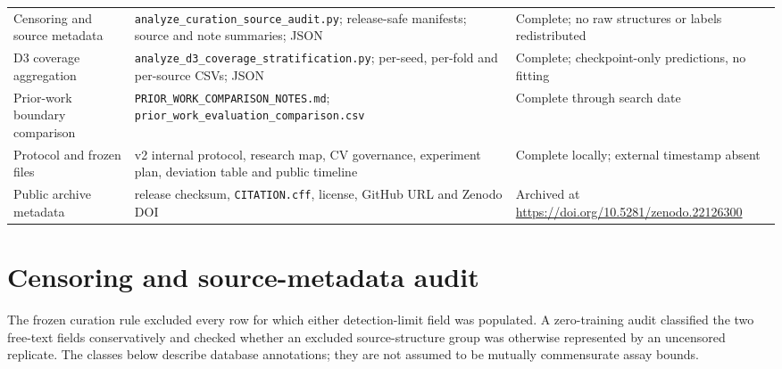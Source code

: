 \documentclass[10pt]{article}
\begin{document}
\begin{table}[htbp]
\begin{tabularx}{\textwidth}{>{\raggedright\arraybackslash}p{}>{\raggedright\arraybackslash}X>{\raggedright\arraybackslash}p{}}
Censoring and source metadata & \texttt{analyze\_\allowbreak{}curation\_\allowbreak{}source\_\allowbreak{}audit.py}; release-safe manifests; source and note summaries; JSON & Complete; no raw structures or labels redistributed \\
D3 coverage aggregation & \texttt{analyze\_\allowbreak{}d3\_\allowbreak{}coverage\_\allowbreak{}stratification.py}; per-seed, per-fold and per-source CSVs; JSON & Complete; checkpoint-only predictions, no fitting \\
Prior-work boundary comparison & \texttt{PRIOR\_\allowbreak{}WORK\_\allowbreak{}COMPARISON\_\allowbreak{}NOTES.md}; \texttt{prior\_\allowbreak{}work\_\allowbreak{}evaluation\_\allowbreak{}comparison.csv} & Complete through search date \\
Protocol and frozen files & v2 internal protocol, research map, CV governance, experiment plan, deviation table and public timeline & Complete locally; external timestamp absent \\
Public archive metadata & release checksum, \texttt{CITATION.cff}, license, GitHub URL and Zenodo DOI & Archived at \url{https://doi.org/10.5281/zenodo.22126300} \\
\bottomrule
\end{tabularx}
\end{table}

\section*{Censoring and source-metadata audit}

The frozen curation rule excluded every row for which either detection-limit field was populated. A zero-training audit classified the two free-text fields conservatively and checked whether an excluded source-structure group was otherwise represented by an uncensored replicate. The classes below describe database annotations; they are not assumed to be mutually commensurate assay bounds.
\end{document}
